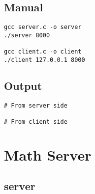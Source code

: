\documentclass[12pt]{article}
\begin{document}
\subsection{Manual}

\begin{lstlisting}
gcc server.c -o server
./server 8000

gcc client.c -o client
./client 127.0.0.1 8000
\end{lstlisting}

\subsection{Output}

\begin{lstlisting}
# From server side

# From client side
\end{lstlisting}

\section{Math Server}
\subsection{server}
\end{document}
